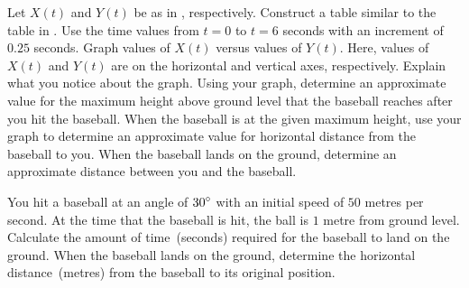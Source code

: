\documentclass[a4paper,oneside,12pt]{article}
\begin{document}
\begin{problem}
\begin{packedenum}
  \item\label{subprob:trigonometric:baseball_trajectory}
    Let $X(t)$ and $Y(t)$ be as
    in ,
    respectively.  Construct a table similar to the table in
    .
    Use the time values from $t = 0$ to $t = 6$ seconds with an
    increment of $0.25$ seconds.  Graph values of $X(t)$ versus values
    of $Y(t)$.  Here, values of $X(t)$ and $Y(t)$ are on the
    horizontal and vertical axes, respectively.  Explain what you
    notice about the graph.  Using your graph, determine an
    approximate value for the maximum height above ground level that
    the baseball reaches after you hit the baseball.  When the
    baseball is at the given maximum height, use your graph to
    determine an approximate value for horizontal distance from the
    baseball to you.  When the baseball lands on the ground, determine
    an approximate distance between you and the baseball.

  \item\label{subprob:trigonometric:baseball_trajectory_30_degree}
    You hit a baseball at an angle of ${30}^{\circ}$ with an initial
    speed of $50$ metres per second.  At the time that the baseball is
    hit, the ball is $1$ metre from ground level.  Calculate the
    amount of time~(seconds) required for the baseball to land on the
    ground.  When the baseball lands on the ground, determine the
    horizontal distance~(metres) from the baseball to its original
    position.
  \end{packedenum}
\end{problem}
\end{document}
